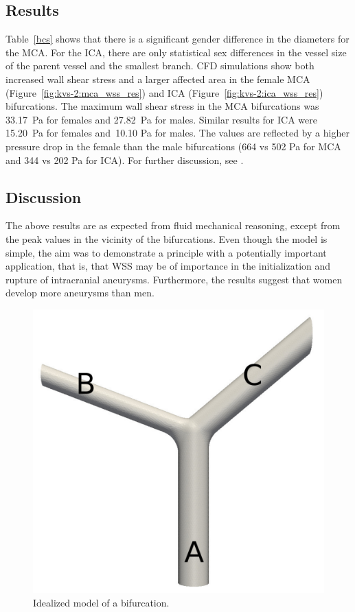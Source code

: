 \subsection{Results}

Table~\ref{bcs} shows that there is a significant gender difference in
the diameters for the MCA. For the ICA, there are only statistical sex
differences in the vessel size of the parent vessel and the smallest
branch. CFD simulations show both increased wall shear stress and a
larger affected area in the female MCA
(Figure~\ref{fig:kvs-2:mca_wss_res}) and ICA
(Figure~\ref{fig:kvs-2:ica_wss_res}) bifurcations. The maximum wall
shear stress in the MCA bifurcations was 33.17~Pa for females and
27.82~Pa for males. Similar results for ICA were 15.20~Pa for females
and~10.10 Pa for males. The values are reflected by a higher pressure
drop in the female than the male bifurcations (664 vs 502 Pa for MCA
and 344 vs 202 Pa for ICA). For further discussion,
see \citet{LindekleivValen-SendstadMorganEtAl2010}.

\subsection{Discussion}

The above results are as expected from fluid mechanical reasoning,
except from the peak values in the vicinity of the bifurcations. Even
though the model is simple, the aim was to demonstrate a principle
with a potentially important application, that is, that WSS may be of
importance in the initialization and rupture of intracranial
aneurysms. Furthermore, the results suggest that women develop more
aneurysms than men.

\begin{figure}
  \center\includegraphics[width=\largefig]{chapters/kvs-2/pdf/bifurcation_clean.pdf}
  \caption{Idealized model of a bifurcation.}
\end{figure}

